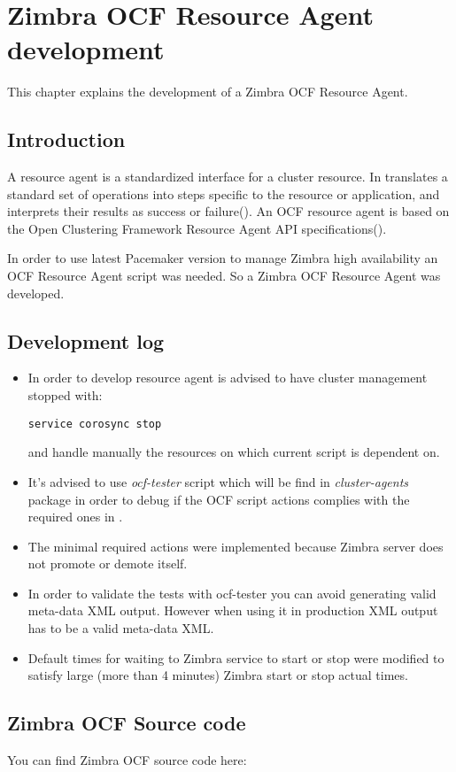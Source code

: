 

\chapter{Zimbra OCF Resource Agent development}
\label{chap:zimbra-ocf}
This chapter explains the development of a Zimbra OCF Resource Agent.

\section {Introduction}
A resource agent is a standardized interface for a cluster resource. In translates a standard set of operations into steps specific to the resource or application, and interprets their results as success or failure(\cite{ResourceAgentsWiki}). An OCF resource agent is based on the Open Clustering Framework Resource Agent API specifications(\cite{OCFResourceAgentsWiki}).

In order to use latest Pacemaker version to manage Zimbra high availability an OCF Resource Agent script was needed. So a Zimbra OCF Resource Agent was developed.

\section {Development log}
\begin{itemize}
  \item {In order to develop resource agent is advised to have cluster management stopped with:
\begin{verbatim}
service corosync stop
\end{verbatim}
and handle manually the resources on which current script is dependent on.
  }
  \item {It's advised to use \textit{ocf-tester} script which will be find in \textit{cluster-agents} package in order to debug if the OCF script actions complies with the required ones in \cite{OCFResourceAgentsWiki}.
  }
  \item {The minimal required actions were implemented because Zimbra server does not promote or demote itself.
  }
  \item {In order to validate the tests with ocf-tester you can avoid generating valid meta-data XML output. However when using it in production XML output has to be a valid meta-data XML. 
  }
  \item {Default times for waiting to Zimbra service to start or stop were modified to satisfy large (more than 4 minutes) Zimbra start or stop actual times.
  }
\end{itemize}

\section {Zimbra OCF Source code}

You can find Zimbra OCF source code here:





